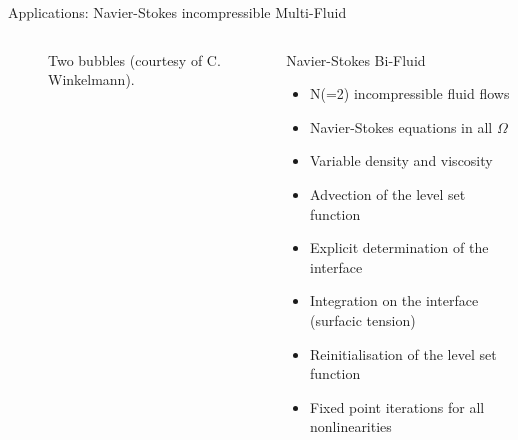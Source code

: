 \documentclass[final,utf8,,hyperref={pdfpagelabels=false}]{beamer}
\newcommand{\goodgap}{%
  \hspace{\subfigtopskip}%
  \hspace{\subfigbottomskip}}
\begin{document}
\begin{frame}[containsverbatim]{}
\begin{columns}[t]
\begin{block}{Applications: Navier-Stokes incompressible Multi-Fluid}
\begin{columns}[t]
\begin{column}{.45\textwidth}
\begin{figure}
      \goodgap
      \caption{Two bubbles (courtesy of C. Winkelmann).}
      \label{fig:1}
    \end{figure}
      \end{column}
      \begin{column}{.52\textwidth} \vspace*{-1cm}
          \begin{block}{Navier-Stokes Bi-Fluid}
            \begin{itemize}
            \item N(=2) incompressible fluid flows
            \item Navier-Stokes equations in all  $\Omega$
            \item Variable density and viscosity
              
            \item Advection of the level set function
            \item Explicit determination of the interface
            \item Integration on the interface (surfacic tension)
            \item Reinitialisation of the  level set function
              
            \item Fixed point iterations for all nonlinearities
              

\end{itemize}
\end{block}
\end{column}
\end{columns}
\end{block}
\end{columns}
\end{frame}
\end{document}
